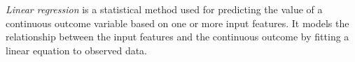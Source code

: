 









\emph{Linear regression} \cite{linear_regression} is a statistical method used for predicting the value of a continuous outcome variable based on one or more input features. It models the relationship between the input features and the continuous outcome by fitting a linear equation to observed data.


